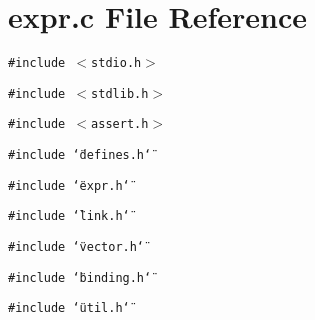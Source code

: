 \section{expr.c File Reference}
\label{expr_8c}
{\tt \#include $<$stdio.h$>$}\par
{\tt \#include $<$stdlib.h$>$}\par
{\tt \#include $<$assert.h$>$}\par
{\tt \#include \char`\"{}defines.h\char`\"{}}\par
{\tt \#include \char`\"{}expr.h\char`\"{}}\par
{\tt \#include \char`\"{}link.h\char`\"{}}\par
{\tt \#include \char`\"{}vector.h\char`\"{}}\par
{\tt \#include \char`\"{}binding.h\char`\"{}}\par
{\tt \#include \char`\"{}util.h\char`\"{}}\par
